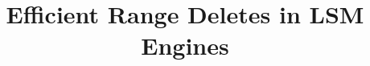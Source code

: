 \documentclass[10pt,sigconf]{acmart}
\begin{document}
\title{Efficient Range Deletes in LSM Engines}






\begin{abstract}
    
\end{abstract}





\maketitle
\end{document}
